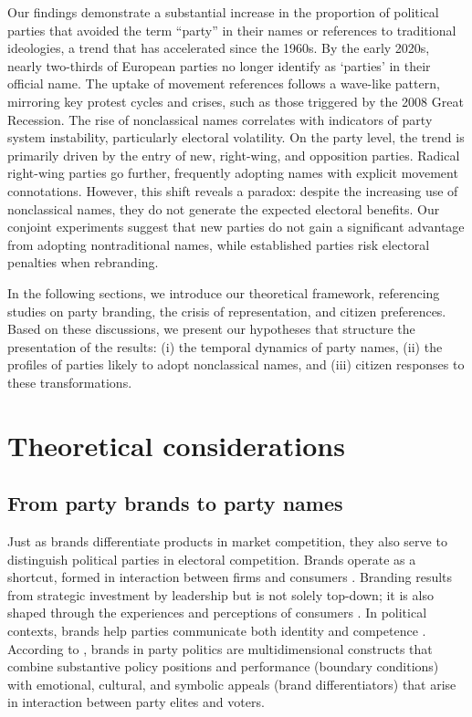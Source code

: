 \documentclass[12pt]{article}
\begin{document}
Our findings demonstrate a substantial increase in the proportion of political parties that avoided the term ``party'' in their names or references to traditional ideologies, a trend that has accelerated since the 1960s. By the early 2020s, nearly two-thirds of European parties no longer identify as ‘parties’ in their official name. The uptake of movement references follows a wave-like pattern, mirroring key protest cycles and crises, such as those triggered by the 2008 Great Recession. The rise of nonclassical names correlates with indicators of party system instability, particularly electoral volatility. On the party level, the trend is primarily driven by the entry of new, right-wing, and opposition parties. Radical right-wing parties go further, frequently adopting names with explicit movement connotations. However, this shift reveals a paradox: despite the increasing use of nonclassical names, they do not generate the expected electoral benefits. Our conjoint experiments suggest that new parties do not gain a significant advantage from adopting nontraditional names, while established parties risk electoral penalties when rebranding.

In the following sections, we introduce our theoretical framework, referencing studies on party branding, the crisis of representation, and citizen preferences. Based on these discussions, we present our hypotheses that structure the presentation of the results: (i) the temporal dynamics of party names, (ii) the profiles of parties likely to adopt nonclassical names, and (iii) citizen responses to these transformations.

\section{Theoretical considerations}

\subsection{From party brands to party names}

Just as brands differentiate products in market competition, they also serve to distinguish political parties in electoral competition. Brands operate as a shortcut, formed in interaction between firms and consumers \citep{Kornberger_2010}. Branding results from strategic investment by leadership but is not solely top-down; it is also shaped through the experiences and perceptions of consumers \citep{Clifton_2009}. In political contexts, brands help parties communicate both identity and competence \citep[for an overview:][]{Ishiyama_Rybalko_2023}. According to \citet{Scammell_2015}, brands in party politics are multidimensional constructs that combine substantive policy positions and performance (boundary conditions) with emotional, cultural, and symbolic appeals (brand differentiators) that arise in interaction between party elites and voters.
\end{document}
